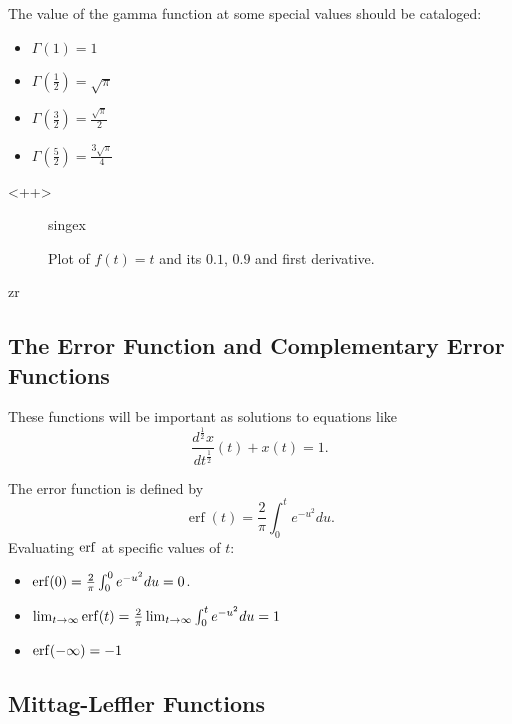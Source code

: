 The value of the gamma function at some special values should be cataloged:
\begin{itemize}
  \item $\Gamma(1) = 1$
  \item $\Gamma\left(\frac{1}{2}\right) = \sqrt{\pi}$
  \item $\Gamma\left(\frac{3}{2}\right) = \frac{\sqrt{\pi}}{2}$
  \item $\Gamma\left(\frac{5}{2}\right) = \frac{3 \sqrt{\pi}}{4}$
\end{itemize}<++>

\begin{figure}
  \centering
  {singex}
  \caption{Plot of $f(t) = t$ and its $0.1$, $0.9$ and first derivative.}
  \label{fig:singex}
\end{figure}
zr
\subsection{The Error Function and Complementary Error Functions}
These functions will be important as solutions to equations like
\begin{equation*}
  \frac{d^\frac{1}{2} x}{d t^\frac{1}{2}}(t) + x(t) = 1.
\end{equation*}

The error function is defined by
\begin{equation}
  \boxed{ \operatorname{erf}(t) = \frac{2}{\pi} \int_0^t e^{-u^2} du. }
  \label{eq:erf}
\end{equation}
Evaluating $\operatorname{erf}$ at specific values of $t$:
\begin{itemize}
  \item $\operatorname{erf}(0) = \frac{2}{\pi} \int_0^0 e^{-u^2} du = 0$.
  \item $\lim_{t \rightarrow \infty} \operatorname{erf}(t) = \frac{2}{\pi} \lim_{t \rightarrow\infty}\int_0^t e^{-u^2} du = 1$
  \item $\operatorname{erf}(-\infty) = -1$
\end{itemize}

\subsection{Mittag-Leffler Functions}

